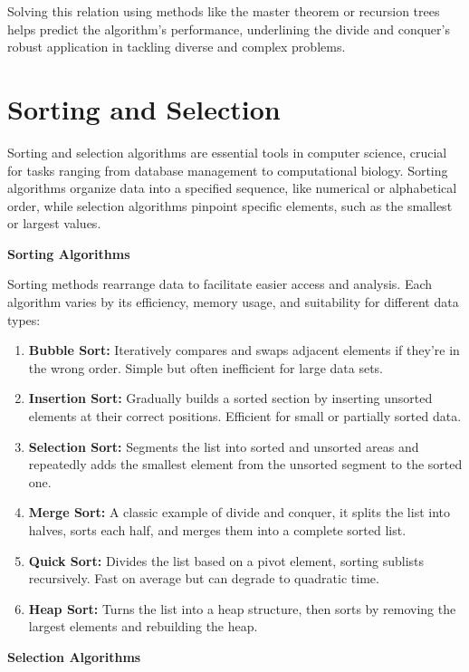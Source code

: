 \documentclass[12pt]{book} %
\begin{document}
Solving this relation using methods like the master theorem or recursion trees helps predict the algorithm’s performance, underlining the divide and conquer’s robust application in tackling diverse and complex problems.


\section{Sorting and Selection}

Sorting and selection algorithms are essential tools in computer science, crucial for tasks ranging from database management to computational biology. Sorting algorithms organize data into a specified sequence, like numerical or alphabetical order, while selection algorithms pinpoint specific elements, such as the smallest or largest values.

\textbf{Sorting Algorithms}

Sorting methods rearrange data to facilitate easier access and analysis. Each algorithm varies by its efficiency, memory usage, and suitability for different data types:
\begin{enumerate}
    \item \textbf{Bubble Sort:} Iteratively compares and swaps adjacent elements if they're in the wrong order. Simple but often inefficient for large data sets.
    \item \textbf{Insertion Sort:} Gradually builds a sorted section by inserting unsorted elements at their correct positions. Efficient for small or partially sorted data.
    \item \textbf{Selection Sort:} Segments the list into sorted and unsorted areas and repeatedly adds the smallest element from the unsorted segment to the sorted one.
    \item \textbf{Merge Sort:} A classic example of divide and conquer, it splits the list into halves, sorts each half, and merges them into a complete sorted list.
    \item \textbf{Quick Sort:} Divides the list based on a pivot element, sorting sublists recursively. Fast on average but can degrade to quadratic time.
    \item \textbf{Heap Sort:} Turns the list into a heap structure, then sorts by removing the largest elements and rebuilding the heap.
\end{enumerate}

\textbf{Selection Algorithms}
\end{document}
